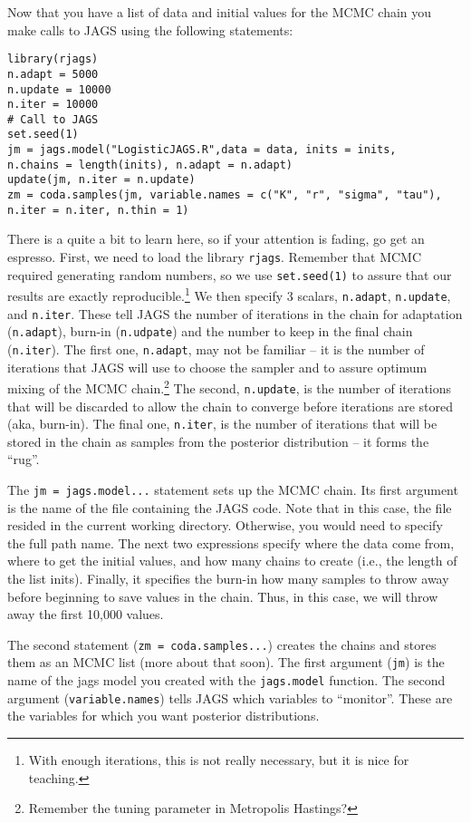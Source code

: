 \documentclass[12pt,english]{article}
\begin{document}
Now that you have a list of data and initial values for the MCMC chain you make calls to JAGS using the following statements:

\begin{Verbatim}
library(rjags)
n.adapt = 5000
n.update = 10000
n.iter = 10000
# Call to JAGS
set.seed(1)
jm = jags.model("LogisticJAGS.R",data = data, inits = inits, 
n.chains = length(inits), n.adapt = n.adapt)
update(jm, n.iter = n.update)
zm = coda.samples(jm, variable.names = c("K", "r", "sigma", "tau"),
n.iter = n.iter, n.thin = 1)
\end{Verbatim}

\noindent There is a quite a bit to learn here, so if your attention is fading, go get an espresso. First, we need to load the library \texttt{rjags}. Remember that MCMC required generating random numbers, so we use \texttt{set.seed(1)} to assure that our results are exactly reproducible.\footnote{With enough iterations, this is not really necessary, but it is nice for teaching.} We then specify 3 scalars, \texttt{n.adapt},  \texttt{n.update}, and \texttt{n.iter}. These tell JAGS the number of iterations in the chain for adaptation (\texttt{n.adapt}), burn-in (\texttt{n.udpate}) and the number to keep in the final chain (\texttt{n.iter}). The first one, \texttt{n.adapt}, may not be familiar -- it is the number of iterations that JAGS will use to choose the sampler and to assure optimum mixing of the MCMC chain.\footnote{Remember the tuning parameter in Metropolis Hastings?} The second, \texttt{n.update}, is the number of iterations that will be discarded to allow the chain to converge before iterations are stored (aka, burn-in). The final one, \texttt{n.iter}, is the number of iterations that will be stored in the chain as samples from the posterior distribution -- it forms the \enquote{rug}.

The \texttt{jm = jags.model...} statement sets up the MCMC chain. Its first argument is the name of the file containing the JAGS code. Note that in this case, the file resided in the current working directory. Otherwise, you would need to specify the full path name. The next two expressions specify where the data come from, where to get the initial values, and how many chains to create (i.e., the length of the list inits). Finally, it specifies the burn-in how many samples to throw away before beginning to save values in the chain. Thus, in this case, we will throw away the first 10,000 values.

The second statement (\texttt{zm = coda.samples...}) creates the chains and stores them as an MCMC list (more about that soon). The first argument (\texttt{jm}) is the name of the jags model you created with the \texttt{jags.model} function. The second argument (\texttt{variable.names}) tells JAGS which variables to \enquote{monitor}. These are the variables for which you want posterior distributions.
\end{document}
